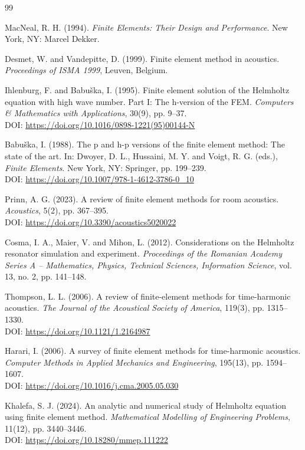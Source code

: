 \documentclass{jors}
\begin{document}
\begin{thebibliography}{99}

MacNeal, R. H. (1994).
\textit{Finite Elements: Their Design and Performance}.
New York, NY: Marcel Dekker.

Desmet, W. and Vandepitte, D. (1999).
Finite element method in acoustics.
\textit{Proceedings of ISMA 1999}, Leuven, Belgium.

Ihlenburg, F. and Babu{\v{s}}ka, I. (1995).
Finite element solution of the Helmholtz equation with high wave number.
Part I: The h-version of the FEM.
\textit{Computers \& Mathematics with Applications}, 30(9), pp. 9--37.\\
DOI: \url{https://doi.org/10.1016/0898-1221(95)00144-N}

Babu{\v{s}}ka, I. (1988).
The p and h-p versions of the finite element method: The state of the art.
In: Dwoyer, D. L., Hussaini, M. Y. and Voigt, R. G. (eds.),
\textit{Finite Elements}.
New York, NY: Springer, pp. 199--239.\\
DOI: \url{https://doi.org/10.1007/978-1-4612-3786-0_10}

Prinn, A. G. (2023).
A review of finite element methods for room acoustics.
\textit{Acoustics}, 5(2), pp. 367--395.\\
DOI: \url{https://doi.org/10.3390/acoustics5020022}

Cosma, I. A., Maier, V. and Mihon, L. (2012).
Considerations on the Helmholtz resonator simulation and experiment.
\textit{Proceedings of the Romanian Academy Series A -- Mathematics, Physics, Technical Sciences, Information Science},
vol. 13, no. 2, pp. 141--148.

Thompson, L. L. (2006).
A review of finite-element methods for time-harmonic acoustics.
\textit{The Journal of the Acoustical Society of America}, 119(3), pp. 1315--1330.\\
DOI: \url{https://doi.org/10.1121/1.2164987}

Harari, I. (2006).
A survey of finite element methods for time-harmonic acoustics.
\textit{Computer Methods in Applied Mechanics and Engineering}, 195(13), pp. 1594--1607.\\
DOI: \url{https://doi.org/10.1016/j.cma.2005.05.030}

Khalefa, S. J. (2024).
An analytic and numerical study of Helmholtz equation using finite element method.
\textit{Mathematical Modelling of Engineering Problems}, 11(12), pp. 3440--3446.\\
DOI: \url{https://doi.org/10.18280/mmep.111222}


\end{thebibliography}
\end{document}
